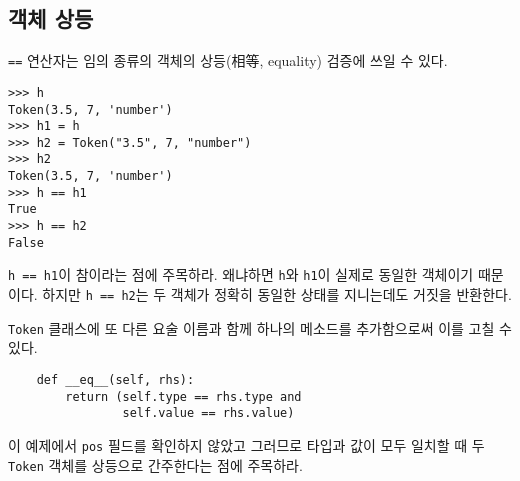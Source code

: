 \documentclass[a4paper]{oblivoir}
\begin{document}
\subsection*{객체 상등}

\texttt{==} 연산자는 임의 종류의 객체의 상등(相等, equality) 검증에 쓰일 수 있다. 

\begin{lstlisting}
>>> h
Token(3.5, 7, 'number')
>>> h1 = h
>>> h2 = Token("3.5", 7, "number")
>>> h2
Token(3.5, 7, 'number')
>>> h == h1
True
>>> h == h2
False
\end{lstlisting}

\noindent\texttt{h == h1}이 참이라는 점에 주목하라. 왜냐하면 \texttt{h}와 \texttt{h1}이 실제로 동일한 객체이기 때문이다. 하지만 \texttt{h == h2}는 두 객체가 정확히 동일한 상태를 지니는데도 거짓을 반환한다. 

\texttt{Token} 클래스에 또 다른 요술 이름과 함께 하나의 메소드를 추가함으로써 이를 고칠 수 있다.

\begin{verbatim}
    def __eq__(self, rhs):
        return (self.type == rhs.type and
                self.value == rhs.value)
\end{verbatim}

이 예제에서 \texttt{pos} 필드를 확인하지 않았고 그러므로 타입과 값이 모두 일치할 때 두 \texttt{Token} 객체를 상등으로 간주한다는 점에 주목하라.
\end{document}
